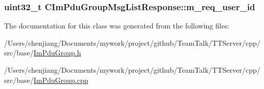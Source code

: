 \subsubsection[{m\+\_\+req\+\_\+user\+\_\+id}]{\setlength{\rightskip}{0pt plus 5cm}uint32\+\_\+t C\+Im\+Pdu\+Group\+Msg\+List\+Response\+::m\+\_\+req\+\_\+user\+\_\+id\hspace{0.3cm}{\ttfamily [private]}}\label{class_c_im_pdu_group_msg_list_response_a36ffdc04b81d17ddee6ed42519d84720}


The documentation for this class was generated from the following files\+:\begin{DoxyCompactItemize}
\item 
/\+Users/chenjiang/\+Documents/mywork/project/github/\+Team\+Talk/\+T\+T\+Server/cpp/src/base/\hyperlink{_im_pdu_group_8h}{Im\+Pdu\+Group.\+h}\item 
/\+Users/chenjiang/\+Documents/mywork/project/github/\+Team\+Talk/\+T\+T\+Server/cpp/src/base/\hyperlink{_im_pdu_group_8cpp}{Im\+Pdu\+Group.\+cpp}\end{DoxyCompactItemize}
